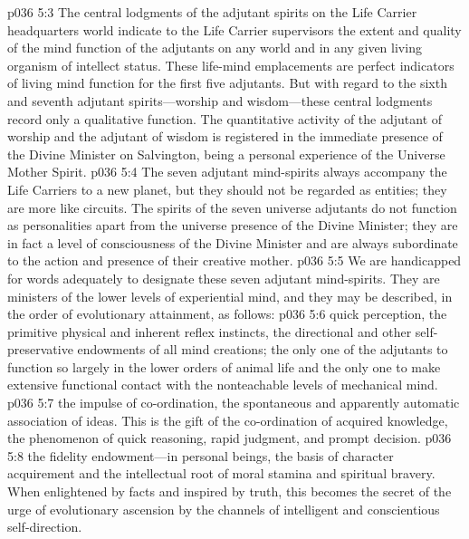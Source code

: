 \vs p036 5:3 The central lodgments of the adjutant spirits on the Life Carrier headquarters world indicate to the Life Carrier supervisors the extent and quality of the mind function of the adjutants on any world and in any given living organism of intellect status. These life\hyp{}mind emplacements are perfect indicators of living mind function for the first five adjutants. But with regard to the sixth and seventh adjutant spirits---worship and wisdom---these central lodgments record only a qualitative function. The quantitative activity of the adjutant of worship and the adjutant of wisdom is registered in the immediate presence of the Divine Minister on Salvington, being a personal experience of the Universe Mother Spirit.
\pc \vs p036 5:4 The seven adjutant mind\hyp{}spirits always accompany the Life Carriers to a new planet, but they should not be regarded as entities; they are more like circuits. The spirits of the seven universe adjutants do not function as personalities apart from the universe presence of the Divine Minister; they are in fact a level of consciousness of the Divine Minister and are always subordinate to the action and presence of their creative mother.
\vs p036 5:5 We are handicapped for words adequately to designate these seven adjutant mind\hyp{}spirits. They are ministers of the lower levels of experiential mind, and they may be described, in the order of evolutionary attainment, as follows:
\pc \vs p036 5:6 \bibnobreakspace {}quick perception, the primitive physical and inherent reflex instincts, the directional and other self\hyp{}preservative endowments of all mind creations; the only one of the adjutants to function so largely in the lower orders of animal life and the only one to make extensive functional contact with the nonteachable levels of mechanical mind.
\pc \vs p036 5:7 \bibnobreakspace {}the impulse of co\hyp{}ordination, the spontaneous and apparently automatic association of ideas. This is the gift of the co\hyp{}ordination of acquired knowledge, the phenomenon of quick reasoning, rapid judgment, and prompt decision.
\pc \vs p036 5:8 \bibnobreakspace {}the fidelity endowment---in personal beings, the basis of character acquirement and the intellectual root of moral stamina and spiritual bravery. When enlightened by facts and inspired by truth, this becomes the secret of the urge of evolutionary ascension by the channels of intelligent and conscientious self\hyp{}direction.
